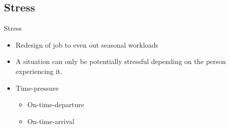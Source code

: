 \subsection{Stress}
\begin{frame}{Stress}{}
    \begin{itemize}
        \item Redesign of job to even out seasonal workloads
        \item A situation can only be potentially stressful depending on the person experiencing it.
        \item Time-pressure
            \begin{itemize}
                \item On-time-departure
                \item On-time-arrival
            \end{itemize}
    \end{itemize}
\end{frame}